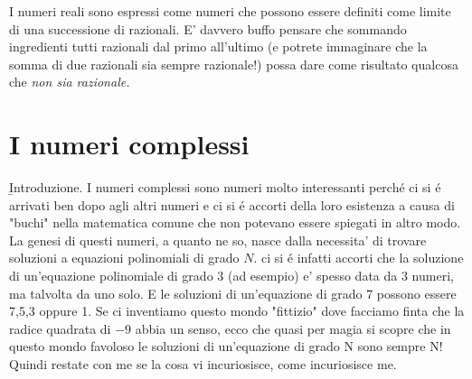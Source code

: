 I numeri reali sono espressi come numeri che possono essere definiti come limite di una successione di razionali. E' davvero buffo pensare che sommando ingredienti tutti razionali dal primo all'ultimo (e potrete immaginare che la somma di due razionali sia sempre razionale!) possa dare come risultato qualcosa che \em{ non} sia razionale.


\section{I numeri complessi}

\b{Introduzione}.
I numeri complessi sono numeri molto interessanti perch\'e ci si \'e arrivati ben dopo agli altri numeri e ci si \'e accorti della loro esistenza a causa di "buchi" nella matematica comune 
che non potevano essere spiegati in altro modo. La genesi di questi numeri, a quanto ne so, nasce dalla necessita' di trovare soluzioni a equazioni polinomiali di grado $N$. ci si \'e infatti
accorti che la soluzione di un'equazione polinomiale di grado 3 (ad esempio) e' spesso data da 3 numeri, ma talvolta da uno solo. E le soluzioni di un'equazione di grado 7 possono essere 7,5,3 oppure 1.
Se ci inventiamo questo mondo "fittizio" dove facciamo finta che la radice quadrata di $-9$ abbia un senso, ecco che quasi per magia si scopre che in questo mondo favoloso le soluzioni di un'equazione
di grado N sono sempre N! Quindi restate con me se la cosa vi incuriosisce, come incuriosisce me.
 

